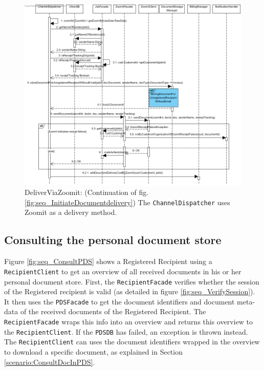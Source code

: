 \documentclass[a4paper,10pt]{article}
\begin{document}
\begin{figure}[!htp]
    \centering
    \includegraphics[width=\textwidth]{DeliverViaZoomit.png}
    \caption{DeliverViaZoomit: (Continuation of  fig. \ref{fig:seq_InitiateDocumentdelivery}) The  \texttt{ChannelDispatcher} uses Zoomit as a delivery method.
        }\label{fig:seq_DeliverViaZoomit}
\end{figure}


\subsection{Consulting the personal document store}
\label{scenario:ConsultPDS}
Figure \ref{fig:seq_ConsultPDS} shows a Registered Recipient using a \texttt{RecipientClient} to get an overview of all received documents in his or her personal document store. First, the \texttt{RecipientFacade} verifies whether the session of the Registered recipient is valid (as detailed in figure \ref{fig:seq_VerifySession}). It then uses the \texttt{PDSFacade} to get the document identifiers and document meta-data of the received documents of the Registered Recipient. The \texttt{RecipientFacade} wraps this info into an overview and returns this overview to the \texttt{RecipientClient}. If the \texttt{PDSDB} has failed, an exception is thrown instead. The \texttt{RecipientClient} can uses the document identifiers wrapped in the overview to download a specific document, as explained in Section \ref{scenario:ConsultDocInPDS}.
\end{document}
